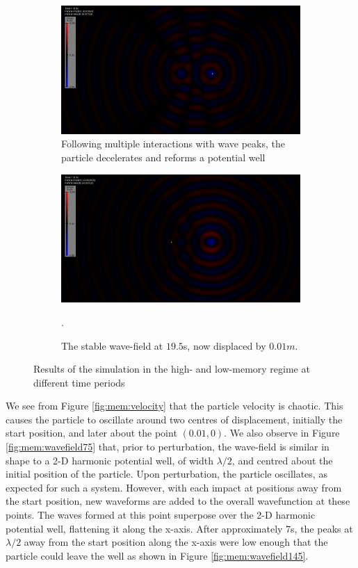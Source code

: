 \begin{figure}
	\begin{subfigure}{0.475\textwidth}
		\includegraphics[width=\textwidth]{simulation/highmemory/wavefield165.png}
		\caption{Following multiple interactions with wave peaks, the particle decelerates and reforms a potential well}
		\label{fig:mem:wavefield165}
	\end{subfigure}
	\hfill
	\begin{subfigure}{0.475\textwidth}
		\includegraphics[width=\textwidth]{simulation/highmemory/wavefield195.png}
		\caption{The stable wave-field at $19.5$s, now displaced by $0.01m$.}
		\label{fig:mem:wavefield195}.
	\end{subfigure}
\caption{Results of the simulation in the high- and low-memory regime at different time periods}
\label{fig:memory}
\end{figure}

We see from Figure \ref{fig:mem:velocity} that the particle velocity is chaotic. This causes the particle to oscillate around two centres of displacement, initially the start position, and later about the point $(0.01,0)$. We also observe in Figure \ref{fig:mem:wavefield75} that, prior to perturbation, the wave-field is similar in shape to a 2-D harmonic potential well, of width $\lambda/2$, and centred about the initial position of the particle. Upon perturbation, the particle oscillates, as expected for such a system. However, with each impact at positions away from the start position, new waveforms are added to the overall wavefunction at these points. The waves formed at this point superpose over the 2-D harmonic potential well, flattening it along the x-axis. After approximately 7s, the peaks at $\lambda/2$ away from the start position along the x-axis were low enough that the particle could leave the well as shown in Figure \ref{fig:mem:wavefield145}.

